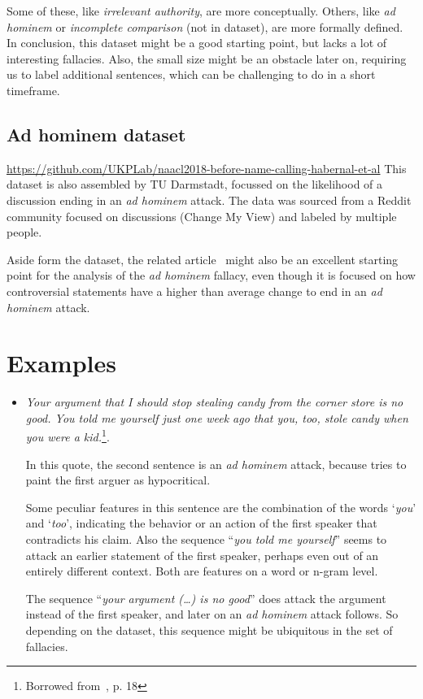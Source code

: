 \documentclass[a4paper]{article}
\begin{document}
Some of these, like \emph{irrelevant authority}, are more conceptually. Others, like \emph{ad hominem} or \emph{incomplete comparison} (not in dataset), are more formally defined. In conclusion, this dataset might be a good starting point, but lacks a lot of interesting fallacies. Also, the small size might be an obstacle later on, requiring us to label additional sentences, which can be challenging to do in a short timeframe. 

\subsection{Ad hominem dataset~\cite{Habernal.et.al.2018.NAACL.adhominem}}
\url{https://github.com/UKPLab/naacl2018-before-name-calling-habernal-et-al}
This dataset is also assembled by TU Darmstadt, focussed on the likelihood of a discussion ending in an \emph{ad hominem} attack. The data was sourced from a Reddit community focused on discussions (Change My View) and labeled by multiple people.  

Aside form the dataset, the related article~\cite{Habernal.et.al.2018.NAACL.adhominem} might also be an excellent starting point for the analysis of the \emph{ad hominem} fallacy, even though it is focused on how controversial statements have a higher than average change to end in an \emph{ad hominem} attack.
\section{Examples}

\begin{itemize}
    \item \emph{Your argument that I should stop stealing candy from the corner store is no good. You told me yourself just one week ago that you, too, stole candy when you were a kid.}\footnote{Borrowed from~\cite{Walton1998}, p. 18}.
    
    In this quote, the second sentence is an \emph{ad hominem} attack, because tries to paint the first arguer as hypocritical. 

    Some peculiar features in this sentence are the combination of the words `\emph{you}' and `\emph{too}', indicating the behavior or an action of the first speaker  that contradicts his claim. Also the sequence ``\emph{you told me yourself}'' seems to attack an earlier statement of the first speaker, perhaps even out of an entirely different context. Both are features on a word or n-gram level.

    The sequence ``\emph{your argument (\dots) is no good}'' does attack the argument instead of the first speaker, and later on an \emph{ad hominem} attack follows. So depending on the dataset, this sequence might be ubiquitous in the set of fallacies.

\end{itemize}



\end{document}

